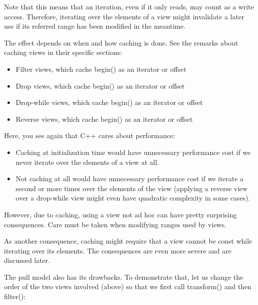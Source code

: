 Note that this means that an iteration, even if it only reads, may count as a write access. Therefore, iterating over the elements of a view might invalidate a later use if its referred range has been modified in the meantime.

The effect depends on when and how caching is done. See the remarks about caching views in their specific sections:

\begin{itemize}
\item
Filter views, which cache begin() as an iterator or offset

\item
Drop views, which cache begin() as an iterator or offset

\item
Drop-while views, which cache begin() as an iterator or offset

\item
Reverse views, which cache begin() as an iterator or offset
\end{itemize}

Here, you see again that C++ cares about performance:

\begin{itemize}
\item
Caching at initialization time would have unnecessary performance cost if we never iterate over the elements of a view at all.

\item
Not caching at all would have unnecessary performance cost if we iterate a second or more times over the elements of the view (applying a reverse view over a drop-while view might even have quadratic complexity in some cases).
\end{itemize}

However, due to caching, using a view not ad hoc can have pretty surprising consequences. Care must be taken when modifying ranges used by views.

As another consequence, caching might require that a view cannot be const while iterating over its elements. The consequences are even more severe and are discussed later.


The pull model also has its drawbacks. To demonstrate that, let us change the order of the two views involved (above) so that we first call transform() and then filter():


